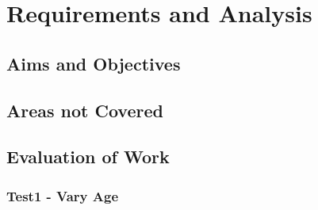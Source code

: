 
\chapter{Requirements and Analysis} %

\label{Chapter4} %

\section{Aims and Objectives}

\section{Areas not Covered}

\section{Evaluation of Work}

\subsection{Test1 - Vary Age}
